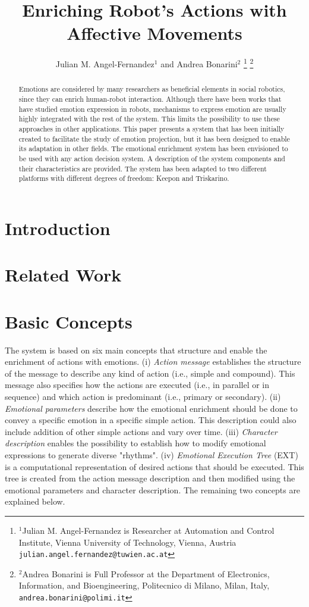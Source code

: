 \documentclass[letterpaper, 10 pt, conference]{ieeeconf}  %
\title{\LARGE \bf
Enriching Robot's Actions with Affective Movements
}
\author{Julian M. Angel-Fernandez$^{1}$ and Andrea Bonarini$^{2}$%
\thanks{$^{1}$Julian M. Angel-Fernandez is Researcher at Automation and Control Institute, Vienna University of Technology, Vienna, Austria
        {\tt\small julian.angel.fernandez@tuwien.ac.at}}%
\thanks{$^{2}$Andrea Bonarini is Full Professor at the Department of Electronics, Information, and Bioengineering, Politecnico di Milano, Milan, Italy,
        {\tt\small andrea.bonarini@polimi.it}}%
}
\begin{document}
\maketitle
\thispagestyle{empty}
\pagestyle{empty}


\begin{abstract}
Emotions are considered by many researchers as beneficial elements in social robotics, since they can enrich human-robot interaction. Although there have been works that have studied emotion expression in robots, mechanisms to express emotion are usually highly integrated with the rest of the system. This limits the possibility to use these approaches in other applications. This paper presents a system that has been initially created to facilitate the study of emotion projection, but it has been designed to enable its adaptation in other fields. The emotional enrichment system has been envisioned to be used with any action decision system. A description of the system components and their characteristics are provided. The system has been adapted to two different platforms with different degrees of freedom: Keepon and Triskarino. 
\end{abstract}

\section{Introduction}

\section{Related Work}
\label{sec:related_work}

\section{Basic Concepts}
\label{sec:concepts}
The system is based on six main concepts that structure and enable the enrichment of actions with emotions. (i) \textit{Action message} establishes the structure of the message to describe any kind of action (i.e., simple and compound). This message also specifies how the actions are executed (i.e., in parallel or in sequence) and which action is predominant (i.e., primary or secondary). (ii) \textit{Emotional parameters} describe how the emotional enrichment should be done to convey a specific emotion in a specific simple action. This description could also include addition of other simple actions and vary over time. (iii) \textit{Character description} enables the possibility to establish how to modify emotional expressions to generate diverse "rhythms". (iv) \textit{Emotional Execution Tree} (EXT) is a computational representation of desired actions that should be executed. This tree is created from the action message description and then modified using the emotional parameters and character description. The remaining two concepts are explained below.
\end{document}
